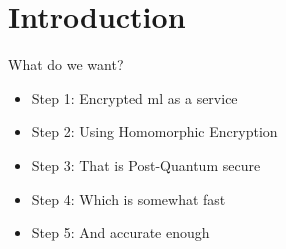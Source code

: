 \section{Introduction}
\begin{frame}{What do we want?}
  \begin{itemize}
    \item Step 1: Encrypted \gls{ml} as a service
    \item Step 2: Using Homomorphic Encryption
    \item Step 3: That is Post-Quantum secure
    \item Step 4: Which is somewhat fast
    \item Step 5: And accurate enough
  \end{itemize}
\end{frame}
